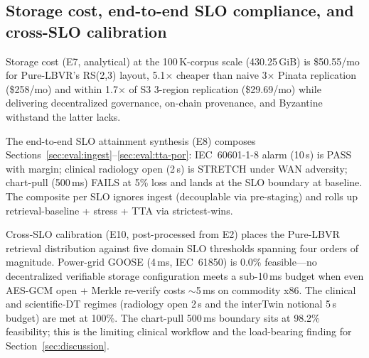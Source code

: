 \subsection{Storage cost, end-to-end SLO compliance, and cross-SLO calibration}
\label{sec:eval:slo}

Storage cost (E7, analytical) at the 100\,K-corpus scale (430.25\,GiB) is \$50.55/mo for Pure-LBVR's RS(2,3) layout, 5.1$\times$ cheaper than naive 3$\times$ Pinata replication (\$258/mo) and within 1.7$\times$ of S3 3-region replication (\$29.69/mo) while delivering decentralized governance, on-chain provenance, and Byzantine withstand the latter lacks.

The end-to-end SLO attainment synthesis (E8) composes Sections~\ref{sec:eval:ingest}--\ref{sec:eval:tta-por}: IEC~60601-1-8 alarm (10\,s) is PASS with margin; clinical radiology open (2\,s) is STRETCH under WAN adversity; chart-pull (500\,ms) FAILS at 5\% loss and lands at the SLO boundary at baseline. The composite per SLO ignores ingest (decouplable via pre-staging) and rolls up retrieval-baseline + stress + TTA via strictest-wins.

Cross-SLO calibration (E10, post-processed from E2) places the Pure-LBVR retrieval distribution against five domain SLO thresholds spanning four orders of magnitude. Power-grid GOOSE (4\,ms, IEC~61850) is 0.0\% feasible---no decentralized verifiable storage configuration meets a sub-10\,ms budget when even AES-GCM open + Merkle re-verify costs $\sim$5\,ms on commodity x86. The clinical and scientific-DT regimes (radiology open 2\,s and the interTwin notional 5\,s budget) are met at 100\%. The chart-pull 500\,ms boundary sits at 98.2\% feasibility; this is the limiting clinical workflow and the load-bearing finding for Section~\ref{sec:discussion}.
